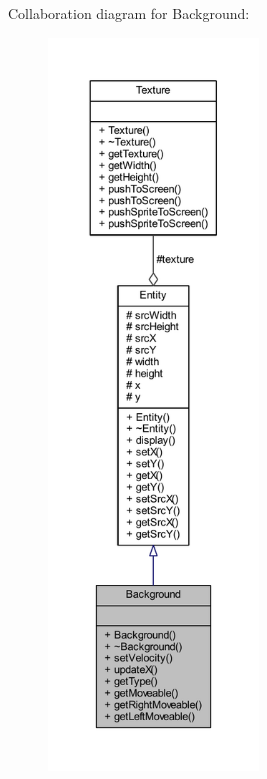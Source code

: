 Collaboration diagram for Background\+:
\nopagebreak
\begin{figure}[H]
\begin{center}
\leavevmode
\includegraphics[height=550pt]{class_background__coll__graph}
\end{center}
\end{figure}
